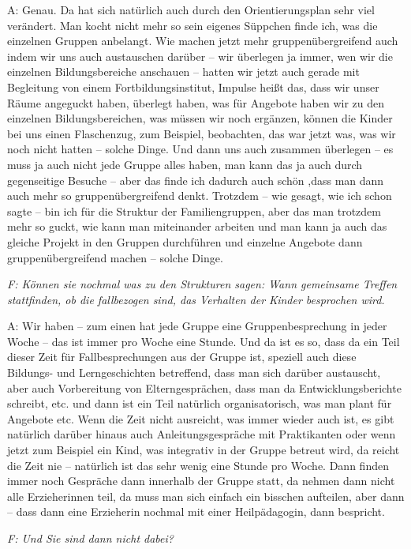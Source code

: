A: Genau. Da hat sich natürlich auch durch den Orientierungsplan sehr viel verändert. Man kocht nicht mehr so sein eigenes Süppchen finde ich, was die einzelnen Gruppen anbelangt. Wie machen jetzt mehr gruppenübergreifend auch indem wir uns auch austauschen darüber – wir überlegen ja immer, wen wir die einzelnen Bildungsbereiche anschauen – hatten wir jetzt auch gerade mit Begleitung von einem Fortbildungsinstitut, Impulse heißt das, dass wir unser Räume angeguckt haben, überlegt haben, was für Angebote haben wir zu den einzelnen Bildungsbereichen, was müssen wir noch ergänzen, können die Kinder bei uns einen Flaschenzug, zum Beispiel, beobachten, das war jetzt was, was wir noch nicht hatten – solche Dinge. Und dann uns auch zusammen überlegen – es muss ja auch nicht jede Gruppe alles haben, man kann das ja auch durch gegenseitige Besuche – aber das finde ich dadurch auch schön ,dass man dann auch mehr so gruppenübergreifend denkt. Trotzdem – wie gesagt, wie ich schon sagte – bin ich für die Struktur der Familiengruppen, aber das man trotzdem mehr so guckt, wie kann man miteinander arbeiten und man kann ja auch das gleiche Projekt in den Gruppen durchführen und einzelne Angebote dann gruppenübergreifend machen – solche Dinge.

\emph{F: Können sie nochmal was zu den Strukturen sagen: Wann gemeinsame Treffen stattfinden, ob die fallbezogen sind, das Verhalten der Kinder besprochen wird.}

A: Wir haben – zum einen hat jede Gruppe eine Gruppenbesprechung in jeder Woche – das ist immer pro Woche eine Stunde. Und da ist es so, dass da ein Teil dieser Zeit für Fallbesprechungen aus der Gruppe ist, speziell auch diese Bildungs- und Lerngeschichten betreffend, dass man sich darüber austauscht, aber auch Vorbereitung von Elterngesprächen, dass man da Entwicklungsberichte schreibt, etc. und dann ist ein Teil natürlich organisatorisch, was man plant für Angebote etc. Wenn die Zeit nicht ausreicht, was immer wieder auch ist, es gibt natürlich darüber hinaus auch Anleitungsgespräche mit Praktikanten oder wenn jetzt zum Beispiel ein Kind, was integrativ in der Gruppe betreut wird, da reicht die Zeit nie – natürlich ist das sehr wenig eine Stunde pro Woche. Dann finden immer noch Gespräche dann innerhalb der Gruppe statt, da nehmen dann nicht alle Erzieherinnen teil, da muss man sich einfach ein bisschen aufteilen, aber dann – dass  dann eine Erzieherin nochmal mit einer Heilpädagogin, dann bespricht.

\emph{F: Und Sie sind dann nicht dabei?}

